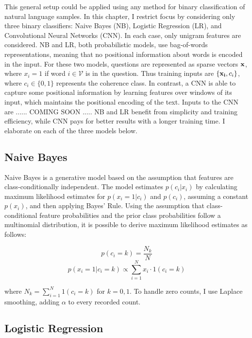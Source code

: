 This general setup could be applied using any method for binary classification of natural language samples. In this chapter, I restrict focus by considering only three binary classifiers: Naive Bayes (NB), Logistic Regression (LR), and Convolutional Neural Networks (CNN). In each case, only unigram features are considered. NB and LR, both probabilistic models, use bag-of-words representations, meaning that no positional information about words is encoded in the input. For these two models, questions are represented as sparse vectors $\bold{x}$, where $x_i = 1$ if word $i \in \mathcal{V}$ is in the question. Thus training inputs are $\{\bold{x_i}, c_i\}$, where $c_i \in \{0, 1\}$ represents the coherence class. In contrast, a CNN is able to capture some positional information by learning features over windows of its input, which maintains the positional encoding of the text. Inputs to the CNN are ...... COMING SOON ..... NB and LR benefit from simplicity and training efficiency, while CNN pays for better results with a longer training time. I elaborate on each of the three models below.

\subsection{Naive Bayes}

Naive Bayes is a generative model based on the assumption that features are class-conditionally independent. The model estimates $p(c_i | x_i)$ by calculating maximum likelihood estimates for $p(x_i = 1 | c_i)$ and $p(c_i)$, assuming a constant $p(x_i)$, and then applying Bayes' Rule. Using the assumption that class-conditional feature probabilities and the prior class probabilities follow a multinomial distribution, it is possible to derive maximum likelihood estimates as follows:
\begin{center}
\begin{equation}
p(c_i = k) = \frac{N_k}{N}
\end{equation}
\begin{equation}
p(x_i = 1 | c_i = k) \propto \sum_{i=1}^N x_i\cdot 1(c_i = k)
\end{equation}
\end{center}
where $N_k = \sum_{i=1}^N 1(c_i = k)$ for $k = 0, 1$. To handle zero counts, I use Laplace smoothing, adding $\alpha$ to every recorded count.

\subsection{Logistic Regression}

